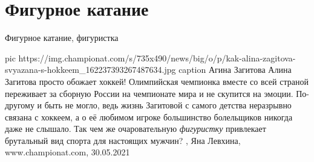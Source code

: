  
 
 
 
 
\chapter{Фигурное катание}
\label{sec:slova.figurnoje_katanie}

Фигурное катание, фигуристка

\ifcmt
  pic https://img.championat.com/s/735x490/news/big/o/p/kak-alina-zagitova-svyazana-s-hokkeem_162237393267487634.jpg
	caption Агина Загитова
\fi
Алина Загитова просто обожает хоккей! Олимпийская чемпионка вместе со всей
страной переживает за сборную России на чемпионате мира и не скупится на
эмоции. По-другому и быть не могло, ведь жизнь Загитовой с самого детства
неразрывно связана с хоккеем, а о её любимом игроке большинство болельщиков
никогда даже не слышало. Так чем же очаровательную \emph{фигуристку} привлекает
брутальный вид спорта для настоящих мужчин?
, 
Яна Левхина, www.championat.com, 30.05.2021

